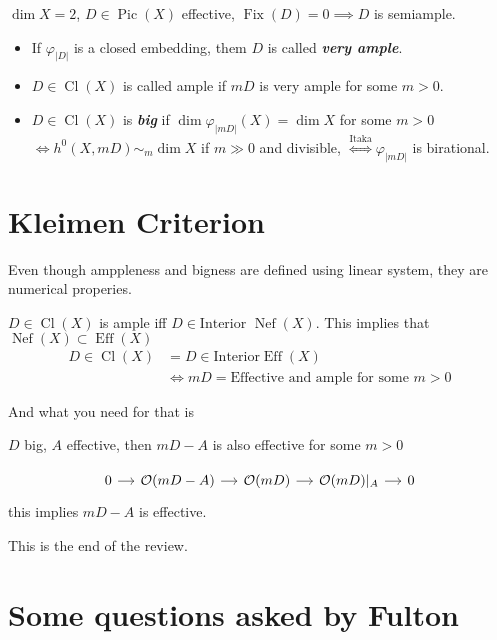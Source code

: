 \begin{coro}
	$\dim X=2$, $D\in\operatorname{Pic}(X)$ effective, $\operatorname{Fix}(D)=0\implies D$ is semiample.
\end{coro}

\begin{itemize}
\item If $\varphi_{|D|}$ is a closed embedding, them $D$ is called \textit{\textbf{very ample}}.
\item $D\in\operatorname{Cl}(X)$ is called ample if $mD$ is very ample for some $m>0$.
\item $D\in\operatorname{Cl}(X)$ is \textit{\textbf{big}} if  $\dim \varphi_{|mD|}(X)=\dim X$ for some $m>0$  $\iff h^0(X,mD)\sim_m\dim X$ if $m\gg 0$ and divisible, $ \overset{\text{Itaka} }{\iff}\varphi_{|mD|}$ is birational. 
\end{itemize} 

\section{Kleimen Criterion}
Even though amppleness and bigness are defined using linear system, they are numerical properies.

\begin{thm}\leavevmode
	$D \in\operatorname{Cl}(X)$ is ample iff $D\in \text{Interior }\operatorname{Nef}(X)$. This implies that $\operatorname{Nef}(X)\subset \operatorname{Eff}(X)$
	\begin{align*}
		D\in\operatorname{Cl}(X)&=D\in\text{Interior} \operatorname{E f f}(X)\\
		&\iff mD=\text{Effective and ample for some } m>0
	\end{align*}
\end{thm}

And what you need for that is

\begin{lemma}
	$D$ big, $A$ effective, then $mD-A$ is also effective for some  $m>0$

	\[\begin{tikzcd}[column sep=small]
		0\arrow[r]&\mathcal{O}(mD-A)\arrow[r]&\mathcal{O}(mD)\arrow[r]&\mathcal{O}(mD)|_{A}\arrow[r]&0	\end{tikzcd}\]
		this implies $mD-A$ is effective.
\end{lemma}

This is the end of the review.

\section{Some questions asked by Fulton}

